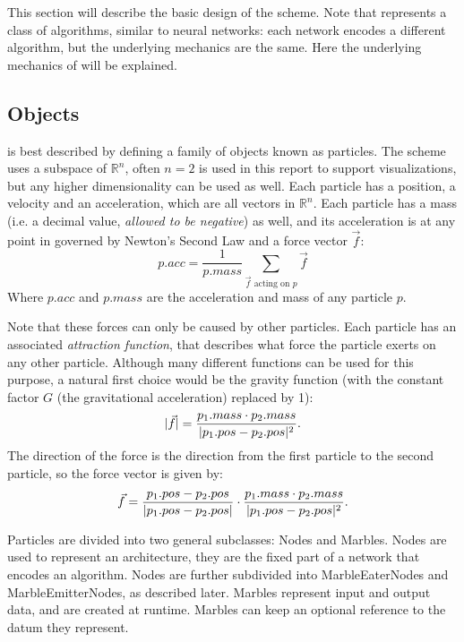 This section will describe the basic design of the \nenwin scheme. Note that \nenwin represents a class of algorithms, similar to neural networks: each network encodes a different algorithm, but the underlying mechanics are the same. Here the underlying mechanics of \nenwin will be explained.

\subsection{Objects}
\nenwin is best described by defining a family of objects known as particles. The scheme uses a subspace of $\mathbb{R}^n$, often $n=2$ is used in this report to support visualizations, but any higher dimensionality can be used as well. Each particle has a position, a velocity and an acceleration, which are all vectors in $\mathbb{R}^n$. Each particle has a mass (i.e. a decimal value, \textit{allowed to be negative}) as well, and its acceleration is at any point in governed by Newton's Second Law \cite{principia} and a force vector $\vec{f}$:
\begin{equation}
    p.acc = \frac{1}{p.mass} \sum_{\vec{f} \text{ acting on } p}\vec{f}
\end{equation}
Where $p.acc$ and $p.mass$ are the acceleration and mass of any particle $p$.

Note that these forces can only be caused by other particles. Each particle has an associated \textit{attraction function}, that describes what force the particle exerts on any other particle. Although many different functions can be used for this purpose, a natural first choice would be the gravity function (with the constant factor $G$ (the gravitational acceleration) replaced by 1):
\begin{equation}
    \lvert \vec{f} \rvert = \frac{p_1.mass \cdot p_2.mass}{\lvert p_1.pos - p_2.pos \rvert^2}. \label{eq:newton_grav_force_norm}
\end{equation}
The direction of the force is the direction from the first particle to the second particle, so the force vector is given by:
\begin{equation}
    \vec{f} = \frac{p_1.pos - p_2.pos}{\lvert p_1.pos - p_2.pos \rvert} \cdot\frac{p_1.mass \cdot p_2.mass}{\lvert p_1.pos - p_2.pos \rvert^2}. \label{eq:newton_grav_force}
\end{equation}

Particles are divided into two general subclasses: Nodes and Marbles. Nodes are used to represent an architecture, they are the fixed part of a \nenwin network that encodes an algorithm. Nodes are further subdivided into MarbleEaterNodes and MarbleEmitterNodes, as described later. Marbles represent input and output data, and are created at runtime. Marbles can keep an optional reference to the datum they represent.

